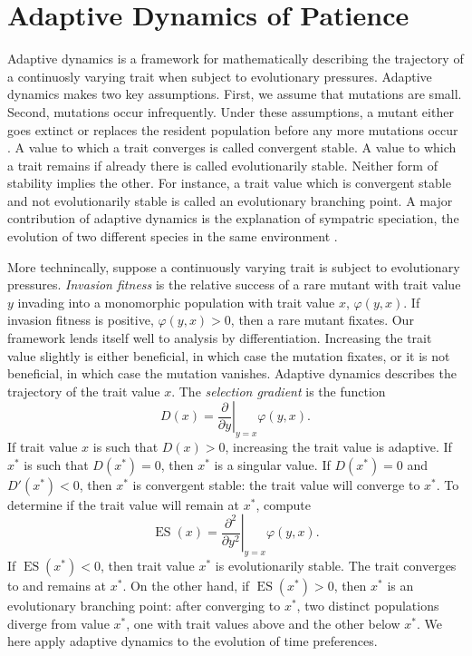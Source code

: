 \documentclass[titlepage, hidelinks, 12pt]{article}
\theoremstyle{plain}
\theoremstyle{remark}
\theoremstyle{definition}
\DeclareMathOperator{\ES}{ES}
\begin{document}
\section{Adaptive Dynamics of Patience}
Adaptive dynamics is a framework for mathematically describing the trajectory of a continuosly varying trait when subject to evolutionary pressures. 
Adaptive dynamics makes two key assumptions. First, we assume that mutations are small. Second, mutations occur infrequently.
Under these assumptions, a mutant either goes extinct or replaces the resident population before any more mutations occur \cite{doebeli05}.
A value to which a trait converges is called convergent stable. A value to which a trait remains if already there is called evolutionarily stable.
Neither form of stability implies the other. For instance, a trait value which is convergent stable and not evolutionarily stable is called an
evolutionary branching point. A major contribution of adaptive dynamics is the explanation of sympatric speciation, the 
evolution of two different species in the same environment \cite{doebeli11}. 

More technincally, suppose a continuously varying trait is subject to evolutionary pressures. \textit{Invasion fitness} is the relative
success of a rare mutant with trait value $y$ invading into a monomorphic population with trait value $x$, $\varphi(y, x)$. If invasion
fitness is positive, $\varphi(y, x) > 0$, then a rare mutant fixates. Our framework lends itself well to analysis by differentiation. 
Increasing the trait value slightly is either beneficial, in which case the mutation fixates, or it is not beneficial, in which
case the mutation vanishes. Adaptive dynamics describes the trajectory of the trait value $x$. 
The \textit{selection gradient} is the function 
\begin{equation}
    D(x) = \left.\frac{\partial }{\partial y} \right\vert_{y = x}\varphi(y, x).
    \label{eqn:selection_gradient}
\end{equation}
If trait value $x$ is such that $D(x) > 0$, increasing the trait value is adaptive. If $x^*$ is such that $D(x^*) = 0$, then $x^*$ is a
singular value. If $D(x^*) = 0$ and $D'(x^*) < 0$, 
then $x^*$ is convergent stable: the trait value will converge to $x^*$. To determine if the trait value will remain at $x^*$, compute
\begin{equation}
    \ES(x) = \left.\frac{\partial^2 }{\partial y^2} \right\vert_{y = x}\varphi(y, x).
    \label{eqn:evolutionary_stability}
\end{equation}
If $\ES(x^*) < 0$, then trait value $x^*$ is evolutionarily stable. The trait converges to and remains at $x^*$. On the other hand, if
$\ES(x^*) > 0$, then $x^*$ is an evolutionary branching point: after converging to $x^*$, two distinct populations diverge from value $x^*$, one
with trait values above and the other below $x^*$.  We here apply adaptive dynamics to the evolution of time preferences. 
\end{document}
